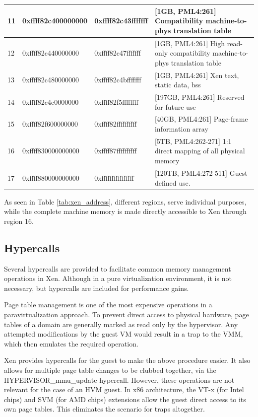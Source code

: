 \begin{longtable}{|m{2ex}|m{20ex}|m{18ex}|m{}|}
    \hline
    11 & 0xffff82c400000000  & 0xffff82c43fffffff & [1GB, PML4:261] Compatibility machine-to-phys translation table \\
    \hline
    12 & 0xffff82c440000000  & 0xffff82c47fffffff & [1GB, PML4:261] High read-only compatibility machine-to-phys translation table \\
    \hline
    13 & 0xffff82c480000000  & 0xffff82c4bfffffff & [1GB, PML4:261] Xen text, static data, bss \\
    \hline
    14 & 0xffff82c4c0000000  & 0xffff82f5ffffffff & [197GB, PML4:261] Reserved for future use \\
    \hline
    15 & 0xffff82f600000000  & 0xffff82ffffffffff & [40GB, PML4:261] Page-frame information array \\
    \hline
    16 & 0xffff830000000000  & 0xffff87ffffffffff & [5TB, PML4:262-271] 1:1 direct mapping of all physical memory\\
    \hline
    17 & 0xffff880000000000  & 0xffffffffffffffff & [120TB, PML4:272-511] Guest-defined use.  \\
\end{longtable}

As seen in Table \ref{tab:xen_address}, different regions, serve individual purposes, while the complete machine memory is made directly accessible to Xen through region 16. 

\subsection{Hypercalls}

Several hypercalls are provided to facilitate common memory management operations in Xen. Although in a pure virtualization environment, it is not necessary, but hypercalls are included for performance gains.

Page table management is one of the most expensive operations in a paravirtualization approach. To prevent direct access to physical hardware, page tables of a domain are generally marked as read only by the hypervisor. Any attempted modifications by the guest VM would result in a trap to the VMM, which then emulates the required operation.

Xen provides hypercalls for the guest to make the above procedure easier. It also allows for multiple page table changes to be clubbed together, via the HYPERVISOR\_mmu\_update hypercall. However, these operations are not relevant for the case of an HVM guest. In x86 architecture, the VT-x (for Intel chips) and SVM (for AMD chips) extensions allow the guest direct access to its own page tables. This eliminates the scenario for traps altogether.

